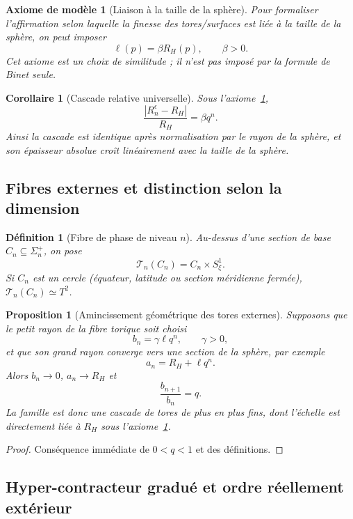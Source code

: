 \documentclass[11pt,a4paper]{article}
\newtheorem{proposition}[theorem]{Proposition}
\newtheorem{corollary}[theorem]{Corollaire}
\newtheorem{definition}[theorem]{Définition}
\newtheorem{axiom}[theorem]{Axiome de modèle}
\begin{document}
\begin{axiom}[Liaison à la taille de la sphère]\label{ax:scale}
Pour formaliser l'affirmation selon laquelle la finesse des tores/surfaces est liée à la taille de la sphère, on peut imposer
\[
 \ell(p)=\beta R_H(p),\qquad \beta>0.
\]
Cet axiome est un choix de similitude ; il n'est pas imposé par la formule de Binet seule.
\end{axiom}

\begin{corollary}[Cascade relative universelle]
Sous l'axiome~\ref{ax:scale},
\[
 \frac{|R_n^\epsilon-R_H|}{R_H}=\beta q^n.
\]
Ainsi la cascade est identique après normalisation par le rayon de la sphère, et son épaisseur absolue croît linéairement avec la taille de la sphère.
\end{corollary}

\subsection{Fibres externes et distinction selon la dimension}

\begin{definition}[Fibre de phase de niveau $n$]
Au-dessus d'une section de base $C_n\subseteq\Sigma_n^+$, on pose
\[
 \mathcal T_n(C_n)=C_n\times S^1_\xi.
\]
Si $C_n$ est un cercle (équateur, latitude ou section méridienne fermée), $\mathcal T_n(C_n)\simeq T^2$.
\end{definition}

\begin{proposition}[Amincissement géométrique des tores externes]
Supposons que le petit rayon de la fibre torique soit choisi
\[
 b_n=\gamma\ell q^n,\qquad \gamma>0,
\]
et que son grand rayon converge vers une section de la sphère, par exemple
\[
 a_n=R_H+\ell q^n.
\]
Alors $b_n\to0$, $a_n\to R_H$ et
\[
 \frac{b_{n+1}}{b_n}=q.
\]
La famille est donc une cascade de tores de plus en plus fins, dont l'échelle est directement liée à $R_H$ sous l'axiome~\ref{ax:scale}.
\end{proposition}

\begin{proof}
Conséquence immédiate de $0<q<1$ et des définitions.
\end{proof}


\subsection{Hyper-contracteur gradué et ordre réellement extérieur}
\end{document}
